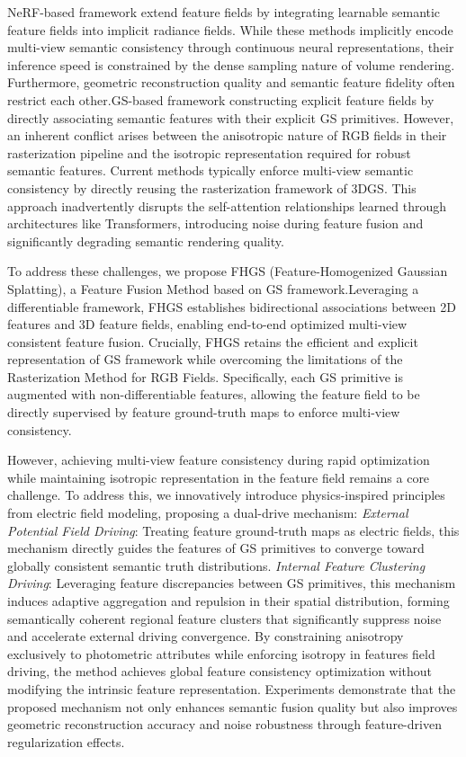 \documentclass[numbers]{article}
\begin{document}
NeRF-based framework extend feature fields by integrating learnable semantic feature fields into implicit radiance fields. While these methods implicitly encode multi-view semantic consistency through continuous neural representations, their inference speed is constrained by the dense sampling nature of volume rendering. Furthermore, geometric reconstruction quality and semantic feature fidelity often restrict each other.GS-based framework constructing explicit feature fields by directly associating semantic features with their explicit GS primitives. However, an inherent conflict arises between the anisotropic nature of RGB fields in their rasterization pipeline and the isotropic representation required for robust semantic features. Current methods typically enforce multi-view semantic consistency by directly reusing the rasterization framework of 3DGS. This approach inadvertently disrupts the self-attention relationships learned through architectures like Transformers, introducing noise during feature fusion and significantly degrading semantic rendering quality.

To address these challenges, we propose FHGS (Feature-Homogenized Gaussian Splatting), a Feature Fusion Method based on GS framework.Leveraging a differentiable framework, FHGS establishes bidirectional associations between 2D features and 3D feature fields, enabling end-to-end optimized multi-view consistent feature fusion. Crucially, FHGS retains the efficient and explicit representation of GS framework while overcoming the limitations of the Rasterization Method for RGB Fields. Specifically, each GS primitive is augmented with non-differentiable features, allowing the feature field to be directly supervised by feature ground-truth maps to enforce multi-view consistency.%

However, achieving multi-view feature consistency during rapid optimization while maintaining isotropic representation in the feature field remains a core challenge.  To address this, we innovatively introduce physics-inspired principles from electric field modeling, proposing a dual-drive mechanism:
\emph{External Potential Field Driving}: Treating feature ground-truth maps as electric fields, this mechanism directly guides the features of GS primitives to converge toward globally consistent semantic truth distributions.
\emph{Internal Feature Clustering Driving}: Leveraging feature discrepancies between GS primitives, this mechanism induces adaptive aggregation and repulsion in their spatial distribution, forming semantically coherent regional feature clusters that significantly suppress noise and accelerate external driving convergence.
By constraining anisotropy exclusively to photometric attributes while enforcing isotropy in features field driving, the method achieves global feature consistency optimization without modifying the intrinsic feature representation. Experiments demonstrate that the proposed mechanism not only enhances semantic fusion quality but also improves geometric reconstruction accuracy and noise robustness through feature-driven regularization effects.
\end{document}
